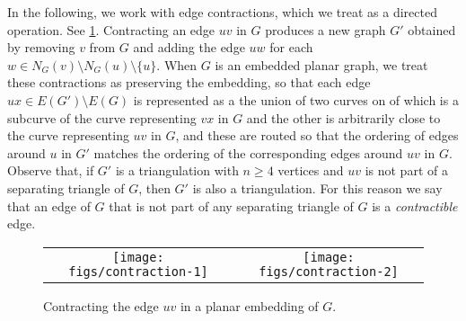 \documentclass{patmorin}
\begin{document}
%

In the following, we work with edge contractions, which we treat as a directed operation. See \cref{contraction}. Contracting an edge $uv$ in $G$ produces a new graph $G'$ obtained by removing $v$ from $G$ and adding the edge $uw$ for each $w\in N_G(v)\setminus N_G(u)\setminus\{u\}$.  When $G$ is an embedded planar graph, we treat these contractions as preserving the embedding, so that each edge $ux\in E(G')\setminus E(G)$ is represented as a the union of two curves on of which is a subcurve of the curve representing $vx$ in $G$ and the other is arbitrarily close to the curve representing $uv$ in $G$, and these are routed so that the ordering of edges around $u$ in $G'$ matches the ordering of the corresponding edges around $uv$ in $G$.  Observe that, if $G'$ is a triangulation with $n\ge 4$ vertices and $uv$ is not part of a separating triangle of $G$, then $G'$ is also a triangulation.  For this reason we say that an edge of $G$ that is not part of any separating triangle of $G$ is a \emph{contractible} edge.

\begin{figure}
    \begin{center}
        \begin{tabular}{cc}
            \texttt{[image: figs/contraction-1]} &
            \texttt{[image: figs/contraction-2]}
        \end{tabular}
    \end{center}
    \caption{Contracting the edge $uv$ in a planar embedding of $G$.}
    \label{contraction}
\end{figure}
\end{document}
